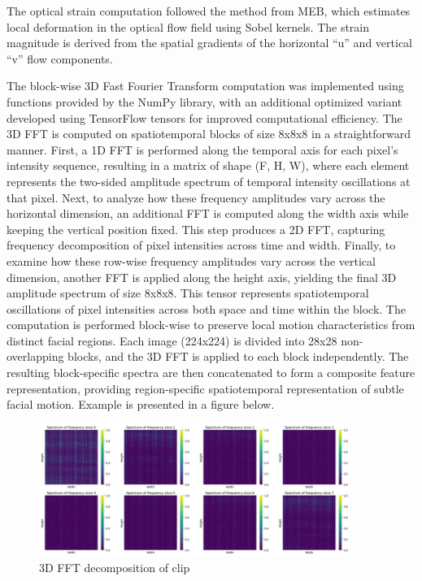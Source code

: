 \documentclass{article}
\begin{document}
The optical strain computation followed the method from MEB, which estimates local deformation in the optical flow field using Sobel kernels. The strain magnitude is derived from the spatial gradients of the horizontal “u” and vertical “v” flow components.

The block-wise 3D Fast Fourier Transform computation was implemented using functions provided by the NumPy library, with an additional optimized variant developed using TensorFlow tensors for improved computational efficiency. The 3D FFT is computed on spatiotemporal blocks of size 8x8x8 in a straightforward manner. First, a 1D FFT is performed along the temporal axis for each pixel’s intensity sequence, resulting in a matrix of shape (F, H, W), where each element represents the two-sided amplitude spectrum of temporal intensity oscillations at that pixel. Next, to analyze how these frequency amplitudes vary across the horizontal dimension, an additional FFT is computed along the width axis while keeping the vertical position fixed. This step produces a 2D FFT, capturing frequency decomposition of pixel intensities across time and width. Finally, to examine how these row-wise frequency amplitudes vary across the vertical dimension, another FFT is applied along the height axis, yielding the final 3D amplitude spectrum of size 8x8x8. This tensor represents spatiotemporal oscillations of pixel intensities across both space and time within the block. The computation is performed block-wise to preserve local motion characteristics from distinct facial regions. Each image (224x224) is divided into 28x28 non-overlapping blocks, and the 3D FFT is applied to each block independently. The resulting block-specific spectra are then concatenated to form a composite feature representation, providing region-specific spatiotemporal representation of subtle facial motion. Example is presented in a figure below.

\begin{figure}[H]
  \begin{center}
    \includegraphics*[width=0.9\textwidth]{Figures/Picture1.png}
  \end{center}
  \caption{3D FFT decomposition of clip}
  \label{fig:fft}
\end{figure}
\end{document}
